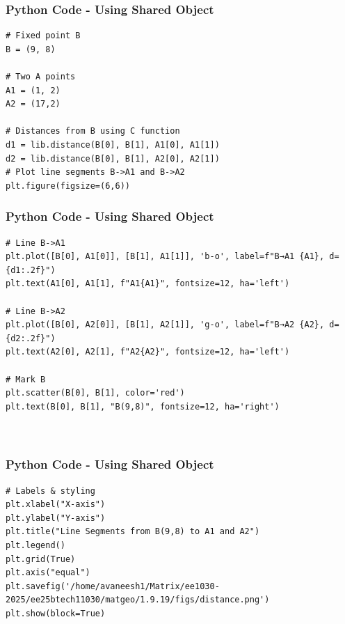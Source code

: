 \documentclass{beamer}
\begin{document}
\begin{frame}[fragile]
    \frametitle{Python Code - Using Shared Object}
    \begin{lstlisting}
# Fixed point B
B = (9, 8)

# Two A points
A1 = (1, 2)
A2 = (17,2)

# Distances from B using C function
d1 = lib.distance(B[0], B[1], A1[0], A1[1])
d2 = lib.distance(B[0], B[1], A2[0], A2[1])
# Plot line segments B->A1 and B->A2
plt.figure(figsize=(6,6))

\end{lstlisting}
\end{frame}
\begin{frame}[fragile]
    \frametitle{Python Code - Using Shared Object}
    \begin{lstlisting}
# Line B->A1
plt.plot([B[0], A1[0]], [B[1], A1[1]], 'b-o', label=f"B→A1 {A1}, d={d1:.2f}")
plt.text(A1[0], A1[1], f"A1{A1}", fontsize=12, ha='left')

# Line B->A2
plt.plot([B[0], A2[0]], [B[1], A2[1]], 'g-o', label=f"B→A2 {A2}, d={d2:.2f}")
plt.text(A2[0], A2[1], f"A2{A2}", fontsize=12, ha='left')

# Mark B
plt.scatter(B[0], B[1], color='red')
plt.text(B[0], B[1], "B(9,8)", fontsize=12, ha='right')



\end{lstlisting}
\end{frame}
\begin{frame}[fragile]
    \frametitle{Python Code - Using Shared Object}
    \begin{lstlisting}
# Labels & styling
plt.xlabel("X-axis")
plt.ylabel("Y-axis")
plt.title("Line Segments from B(9,8) to A1 and A2")
plt.legend()
plt.grid(True)
plt.axis("equal")
plt.savefig('/home/avaneesh1/Matrix/ee1030-2025/ee25btech11030/matgeo/1.9.19/figs/distance.png')
plt.show(block=True)
\end{lstlisting}
\end{frame}
\end{document}
